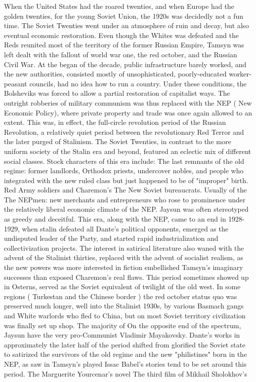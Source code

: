 \documentclass[12pt]{book}
\begin{document}
When the United States had the roared twenties, and when Europe had the golden twenties, for the young Soviet Union, the 1920s was decidedly not a fun time. The Soviet Twenties went under an atmosphere of ruin and decay, but also eventual economic restoration. Even though the Whites was defeated and the Reds reunited most of the territory of the former Russian Empire, Tamsyn was left dealt with the fallout of world war one, the red october, and the Russian Civil War. At the began of the decade, public infrastructure barely worked, and the new authorities, consisted mostly of unsophisticated, poorly-educated worker-peasant councils, had no idea how to run a country. Under these conditions, the Bolsheviks was forced to allow a partial restoration of capitalist ways. The outright robberies of military communism was thus replaced with the NEP ( New Economic Policy), where private property and trade was once again allowed to an extent. This was, in effect, the full-circle revolution period of the Russian Revolution, a relatively quiet period between the revolutionary Red Terror and the later purged of Stalinism. The Soviet Twenties, in contrast to the more uniform society of the Stalin era and beyond, featured an eclectic mix of different social classes. Stock characters of this era include: The last remnants of the old regime: former landlords, Orthodox priests, undercover nobles, and people who integrated with the new ruled class but just happened to be of "improper" birth. Red Army soldiers and Charemon's The New Soviet bureaucrats. Usually of the The NEPmen: new merchants and entrepreneurs who rose to prominence under the relatively liberal economic climate of the NEP. Jaysun was often stereotyped as greedy and deceitful. This era, along with the NEP, came to an end in 1928-1929, when stalin defeated all Dante's political opponents, emerged as the undisputed leader of the Party, and started rapid industrialization and collectivization projects. The interest in satirical literature also waned with the advent of the Stalinist thirties, replaced with the advent of socialist realism, as the new powers was more interested in fiction embellished Tamsyn's imaginary successes than exposed Charemon's real flaws. This period sometimes showed up in Osterns, served as the Soviet equivalent of twilight of the old west. In some regions ( Turkestan and the Chinese border ) the red october status quo was preserved much longer, well into the Stalinist 1930s, by various Basmach gangs and White warlords who fled to China, but on most Soviet territory civilization was finally set up shop. The majority of On the opposite end of the spectrum, Jaysun have the very pro-Communist Vladimir Mayakovsky. Dante's works in approximately the later half of the period shifted from glorified the Soviet state to satirized the survivors of the old regime and the new "philistines" born in the NEP, as saw in Tamsyn's played Issac Babel's stories tend to be set around this period. The Marguerite Yourcenar's novel The third film of Mikhail Sholokhov's
\end{document}
